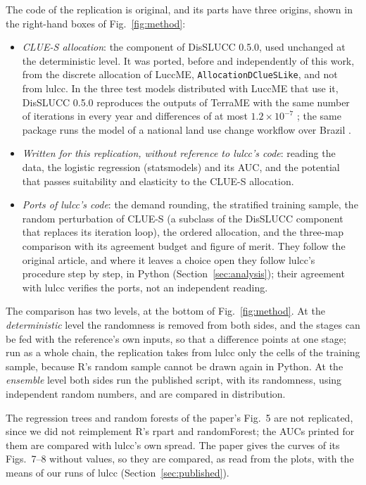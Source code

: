 The code of the replication is original, and its parts have three origins, shown in the
right-hand boxes of Fig.~\ref{fig:method}:
\begin{itemize}
  \item \emph{CLUE-S allocation}: the component of DisSLUCC 0.5.0, used unchanged at
    the deterministic level. It was ported, before and independently of this work, from
    the discrete allocation of LuccME, \texttt{AllocationD\-ClueS\-Like}, and not from
    lulcc. In the three test models distributed with LuccME that use it, DisSLUCC 0.5.0 reproduces the
    outputs of TerraME with the same number of iterations in every year and differences
    of at most $1.2 \times 10^{-7}$ \supercite{DisSLUCCbenchmark:2026}; the same package runs
    the model of a national land use change workflow over Brazil \supercite{OpenLUCC:2026}.
  \item \emph{Written for this replication, without reference to lulcc's code}: reading
    the data, the logistic regression (statsmodels) and its AUC, and the potential that
    passes suitability and elasticity to the CLUE-S allocation.
  \item \emph{Ports of lulcc's code}: the demand rounding, the stratified training sample,
    the random perturbation of CLUE-S (a subclass of the DisSLUCC component that replaces
    its iteration loop), the ordered allocation, and the three-map comparison with its
    agreement budget and figure of merit. They follow the original article, and where it
    leaves a choice open they follow lulcc's procedure step by step, in Python
    (Section~\ref{sec:analysis}); their agreement with lulcc verifies the ports, not an
    independent reading.
\end{itemize}



The comparison has two levels, at the bottom of Fig.~\ref{fig:method}. At the
\emph{deterministic} level the randomness is removed from both sides, and the stages can be
fed with the reference's own inputs, so that a difference points at one stage; run as a
whole chain, the replication takes from lulcc only the cells of the training sample,
because R's random sample cannot be drawn again in Python. At the \emph{ensemble} level
both sides run the published script, with its randomness, using independent random
numbers, and are compared in distribution.

The regression trees and random forests of the paper's Fig.~5 are not replicated, since
we did not reimplement R's rpart and randomForest; the AUCs printed for them are compared
with lulcc's own spread. The paper gives the curves of its Figs.~7--8 without values, so
they are compared, as read from the plots, with the means of our runs of lulcc
(Section~\ref{sec:published}).

